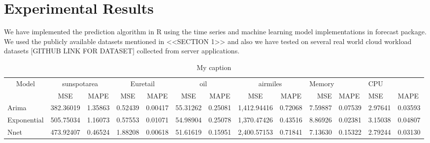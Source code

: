 \usepackage{booktabs}
\usepackage{multirow}
\usepackage[normalem]{ulem}
\useunder{\uline}{\ul}{}

\section{Experimental Results}

We have implemented the prediction algorithm in R using the time series and machine learning model implementations in forecast package. We used the publicly available datasets mentioned in <<SECTION 1>> and also we have tested on several real world cloud workload datasets [GITHUB LINK FOR DATASET] collected from server applications.
\begin{table}[]
\centering
\caption{My caption}
\label{my-label}
\begin{tabular}{|l|l|r|r|r|r|r|r|r|r|l|l|l|}
\hline
\multicolumn{1}{|c|}{\multirow{2}{*}{Model}} & \multicolumn{2}{c|}{sunspotarea}                        & \multicolumn{2}{c|}{Euretail}                               & \multicolumn{2}{c|}{oil}                                     & \multicolumn{2}{c|}{airmiles}                                   & \multicolumn{2}{l|}{Memory} & \multicolumn{2}{l|}{CPU} \\ \cline{2-13} 
\multicolumn{1}{|c|}{}                       & \multicolumn{1}{c|}{MSE} & \multicolumn{1}{c|}{MAPE}    & \multicolumn{1}{c|}{MSE}     & \multicolumn{1}{c|}{MAPE}    & \multicolumn{1}{c|}{MSE}      & \multicolumn{1}{c|}{MAPE}    & \multicolumn{1}{c|}{MSE}         & \multicolumn{1}{c|}{MAPE}    & MSE           & MAPE        & MSE         & MAPE       \\ \hline
Arima                                        & 382.36019                & 1.35863                      & 0.52439                      & 0.00417                      & 55.31262                      & 0.25081                      & 1,412.94416                      & 0.72068                      & 7.59887       & 0.07539     & 2.97641     & 0.03593    \\ \hline
Exponential                                  & 505.75034                & 1.16073                      & 0.57553                      & 0.01071                      & 54.98904                      & 0.25078                      & 1,370.47426                      & 0.43516                      & 8.86926       & 0.02381     & 3.15038     & 0.04807    \\ \hline
Nnet                                         & 473.92407                & 0.46524                      & 1.88208                      & 0.00618                      & 51.61619                      & 0.15951                      & 2,400.57153                      & 0.71841                      & 7.13630       & 0.15322     & 2.79244     & 0.03130    \\ \hline

\end{tabular}
\end{table}
